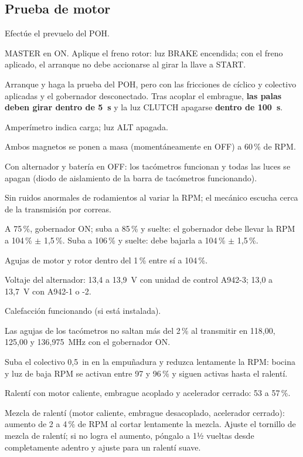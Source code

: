 \subsection{Prueba de motor}

\begin{pasos}
\item Efectúe el prevuelo del POH.
\item \textsf{MASTER} en ON. Aplique el freno rotor: luz \textsf{BRAKE} encendida; con el freno aplicado, el arranque no debe accionarse al girar la llave a START.
\item Arranque y haga la prueba del POH, pero con las fricciones de cíclico y colectivo aplicadas y el gobernador desconectado. Tras acoplar el embrague, \textbf{las palas deben girar dentro de 5~s} y la luz \textsf{CLUTCH} apagarse \textbf{dentro de 100~s}.
\item Amperímetro indica carga; luz \textsf{ALT} apagada.
\item Ambos magnetos se ponen a masa (momentáneamente en OFF) a 60\,\% de RPM.
\item Con alternador y batería en OFF: los tacómetros funcionan y todas las luces se apagan (diodo de aislamiento de la barra de tacómetros funcionando).
\item Sin ruidos anormales de rodamientos al variar la RPM; el mecánico escucha cerca de la transmisión por correas.
\item A 75\,\%, gobernador ON; suba a 85\,\% y suelte: el gobernador debe llevar la RPM a 104\,\% $\pm$ 1,5\,\%. Suba a 106\,\% y suelte: debe bajarla a 104\,\% $\pm$ 1,5\,\%.
\item Agujas de motor y rotor dentro del 1\,\% entre sí a 104\,\%.
\item Voltaje del alternador: 13,4 a 13,9~V con unidad de control A942-3; 13,0 a 13,7~V con A942-1 o -2.
\item Calefacción funcionando (si está instalada).
\item Las agujas de los tacómetros no saltan más del 2\,\% al transmitir en 118,00, 125,00 y 136,975~MHz con el gobernador ON.
\item Suba el colectivo 0,5~in en la empuñadura y reduzca lentamente la RPM: bocina y luz de baja RPM se activan entre 97 y 96\,\% y siguen activas hasta el ralentí.
\item Ralentí con motor caliente, embrague acoplado y acelerador cerrado: 53 a 57\,\%.
\item Mezcla de ralentí (motor caliente, embrague desacoplado, acelerador cerrado): aumento de 2 a 4\,\% de RPM al cortar lentamente la mezcla. Ajuste el tornillo de mezcla de ralentí; si no logra el aumento, póngalo a 1½ vueltas desde completamente adentro y ajuste para un ralentí suave.
\end{pasos}

